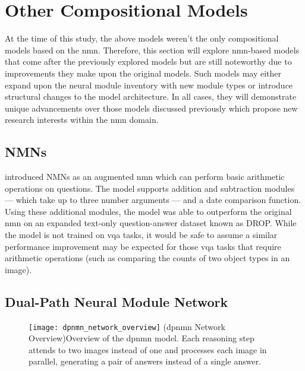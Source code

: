 \graphicspath{{content/chapters/literature_review/other_compositional_models/figures}}

\section{Other Compositional Models}
\label{sec:other_compositional_models}

At the time of this study, the above models weren't the only compositional models based on the \gls{nmn}.
Therefore, this section will explore \gls{nmn}-based models that come after the previously explored models but are still noteworthy due to improvements they make upon the original models.
Such models may either expand upon the neural module inventory with new module types or introduce structural changes to the model architecture.
In all cases, they will demonstrate unique advancements over those models discussed previously which propose new research interests within the \gls{nmn} domain.

\subsection{NMNs\pm{}}
\label{subsec:nmn_plus_minus}

\citeauthor{chen_teaching_2022}\cite{chen_teaching_2022} introduced NMNs\pm{} as an augmented \gls{nmn} which can perform basic arithmetic operations on questions.
The model supports addition and subtraction modules --- which take up to three number arguments --- and a date comparison function.
Using these additional modules, the model was able to outperform the original \gls{nmn} on an expanded text-only question-answer dataset known as DROP.
While the model is not trained on \gls{vqa} tasks, it would be safe to assume a similar performance improvement may be expected for those \gls{vqa} tasks that require arithmetic operations (such as comparing the counts of two object types in an image).

\subsection{Dual-Path Neural Module Network}
\label{subsec:dual_path_neural_module_network}

\begin{figure}[htbp]
    \centering
    \texttt{[image: dpnmn\_network\_overview]}
    \captionsource(\acrshort{dpnmn} Network Overview){Overview of the \acrshort{dpnmn} model. Each reasoning step attends to two images instead of one and processes each image in parallel, generating a pair of answers instead of a single answer. \label{fig:dpnmn_network_overview}}{\citeauthor{su_toward_2020}\cite{su_toward_2020}}
\end{figure}

